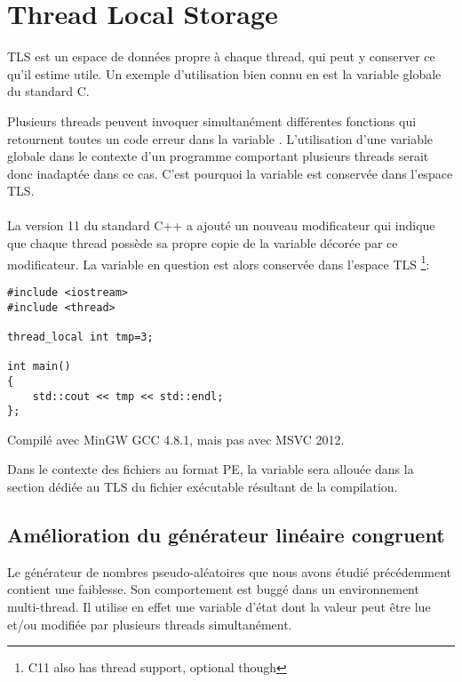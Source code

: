 ﻿\section{Thread Local Storage}
\label{TLS}

TLS est un espace de données propre à chaque thread, qui peut y conserver ce qu'il estime utile.
Un exemple d'utilisation bien connu en est la variable globale  du standard C.

Plusieurs threads peuvent invoquer simultanément différentes fonctions qui retournent toutes un code 
erreur dans la variable . L'utilisation d'une variable globale dans le contexte d'un 
programme comportant plusieurs threads serait donc inadaptée dans ce cas. C'est pourquoi la variable 
 est conservée dans l'espace \ac{TLS}.\\
\\
La version 11 du standard C++ a ajouté un nouveau modificateur  qui indique que 
chaque thread possède sa propre copie de la variable décorée par ce modificateur. La variable en 
question est alors conservée dans l'espace \ac{TLS}
\footnote{ C11 also has thread support, optional though}:

\begin{lstlisting}[caption=C++11,style=customc]
#include <iostream>
#include <thread>

thread_local int tmp=3;

int main()
{
	std::cout << tmp << std::endl;
};
\end{lstlisting}

Compilé avec MinGW GCC 4.8.1, mais pas avec MSVC 2012.

Dans le contexte des fichiers au format PE, la variable  sera allouée dans la section dédiée 
au \ac{TLS} du fichier exécutable résultant de la compilation.

\subsection{Amélioration du générateur linéaire congruent}
\label{LCG_TLS}

Le générateur de nombres pseudo-aléatoires  que nous avons étudié précédemment 
contient une faiblesse. Son comportement est buggé dans un environnement multi-thread. Il utilise 
en effet une variable d'état dont la valeur peut être lue et/ou modifiée par plusieurs threads 
simultanément.




